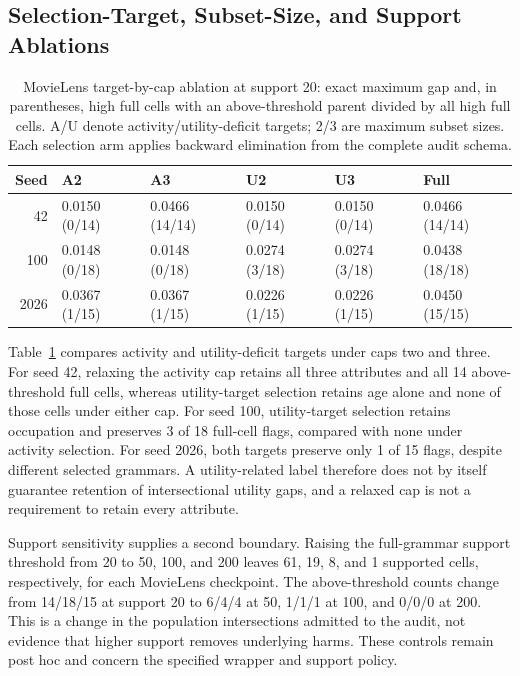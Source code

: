 \documentclass[sigconf,nonacm]{acmart}
\begin{document}
\subsection{Selection-Target, Subset-Size, and Support Ablations}
\begin{table}[t]
\centering
\caption{MovieLens target-by-cap ablation at support 20: exact maximum gap and, in parentheses, high full cells with an above-threshold parent divided by all high full cells. A/U denote activity/utility-deficit targets; 2/3 are maximum subset sizes. Each selection arm applies backward elimination from the complete audit schema.}
\label{tab:target-ablation}
\small
\begin{tabular}{rlllll}
\toprule
Seed & A2 & A3 & U2 & U3 & Full \\
\midrule
42 & 0.0150 (0/14) & 0.0466 (14/14) & 0.0150 (0/14) & 0.0150 (0/14) & 0.0466 (14/14) \\
100 & 0.0148 (0/18) & 0.0148 (0/18) & 0.0274 (3/18) & 0.0274 (3/18) & 0.0438 (18/18) \\
2026 & 0.0367 (1/15) & 0.0367 (1/15) & 0.0226 (1/15) & 0.0226 (1/15) & 0.0450 (15/15) \\
\bottomrule
\end{tabular}
\end{table}

Table~\ref{tab:target-ablation} compares activity and utility-deficit targets under caps two and three. For seed 42, relaxing the activity cap retains all three attributes and all 14 above-threshold full cells, whereas utility-target selection retains age alone and none of those cells under either cap. For seed 100, utility-target selection retains occupation and preserves 3 of 18 full-cell flags, compared with none under activity selection. For seed 2026, both targets preserve only 1 of 15 flags, despite different selected grammars. A utility-related label therefore does not by itself guarantee retention of intersectional utility gaps, and a relaxed cap is not a requirement to retain every attribute.

Support sensitivity supplies a second boundary. Raising the full-grammar support threshold from 20 to 50, 100, and 200 leaves 61, 19, 8, and 1 supported cells, respectively, for each MovieLens checkpoint. The above-threshold counts change from 14/18/15 at support 20 to 6/4/4 at 50, 1/1/1 at 100, and 0/0/0 at 200. This is a change in the population intersections admitted to the audit, not evidence that higher support removes underlying harms. These controls remain post hoc and concern the specified wrapper and support policy.
\end{document}
